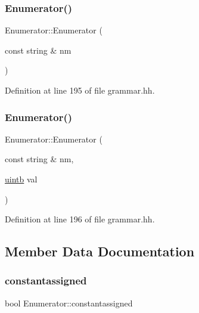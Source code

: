 \subsubsection{\texorpdfstring{Enumerator()}{Enumerator()}\hspace{0.1cm}{\footnotesize\ttfamily [1/2]}}
{\footnotesize\ttfamily Enumerator\+::\+Enumerator (\begin{DoxyParamCaption}\item[{const string \&}]{nm }\end{DoxyParamCaption})\hspace{0.3cm}{\ttfamily [inline]}}



Definition at line 195 of file grammar.\+hh.

\mbox{\label{struct_enumerator_ae8b2e7da98de20271313f23fe8b43699}} 
\subsubsection{\texorpdfstring{Enumerator()}{Enumerator()}\hspace{0.1cm}{\footnotesize\ttfamily [2/2]}}
{\footnotesize\ttfamily Enumerator\+::\+Enumerator (\begin{DoxyParamCaption}\item[{const string \&}]{nm,  }\item[{\mbox{\hyperlink{types_8h_a2db313c5d32a12b01d26ac9b3bca178f}{uintb}}}]{val }\end{DoxyParamCaption})\hspace{0.3cm}{\ttfamily [inline]}}



Definition at line 196 of file grammar.\+hh.



\subsection{Member Data Documentation}
\mbox{\label{struct_enumerator_a913be77691c3f67be0eca6418fe04208}} 
\subsubsection{\texorpdfstring{constantassigned}{constantassigned}}
{\footnotesize\ttfamily bool Enumerator\+::constantassigned}



